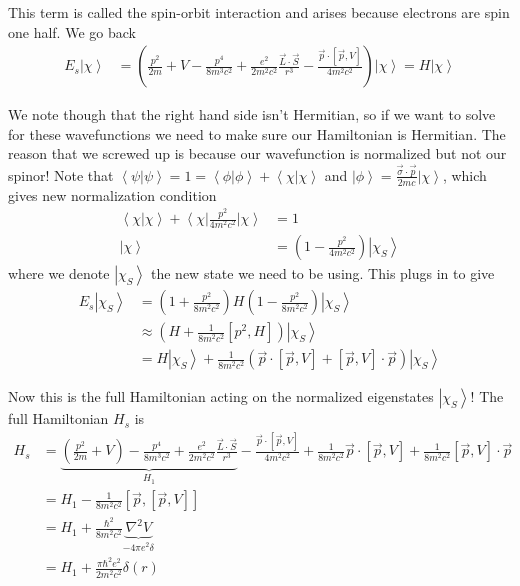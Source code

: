 \documentclass[10pt]{report}
\newcommand{\bra}[1]{\left<#1\right|}
\newcommand{\ket}[1]{\left|#1\right>}
\newcommand{\dotp}[2]{\left<#1\left.\right|#2\right>}
\begin{document}
This term is called the spin-orbit interaction and arises because electrons are spin one half. We go back
\begin{align}
    E_s\ket{\chi} &= \left( \frac{p^2}{2m} + V -\frac{p^4}{8m^3c^2} + \frac{e^2}{2m^2c^2}\frac{\vec{L}\cdot \vec{S}}{r^3} - \frac{\vec{p}\cdot\left[ \vec{p},V \right]}{4m^2c^2} \right)\ket{\chi} = H\ket{\chi}
\end{align}

We note though that the right hand side isn't Hermitian, so if we want to solve for these wavefunctions we need to make sure our Hamiltonian is Hermitian. The reason that we screwed up is because our wavefunction is normalized but not our spinor! Note that $\dotp{\psi}{\psi} = 1 = \dotp{\phi}{\phi} + \dotp{\chi}{\chi}$ and $\ket{\phi} = \frac{\vec{\sigma}\cdot \vec{p}}{2mc}\ket{\chi}$, which gives new normalization condition
\begin{align}
    \dotp{\chi}{\chi} + \bra{\chi}\frac{p^2}{4m^2c^2}\ket{\chi} &= 1\\
    \ket{\chi} &= \left( 1 - \frac{p^2}{4m^2c^2} \right)\ket{\chi_S}
\end{align}
where we denote $\ket{\chi_S}$ the new state we need to be using. This plugs in to give
\begin{align}
    E_s\ket{\chi_S} &= \left( 1 + \frac{p^2}{8m^2c^2} \right)H\left( 1 - \frac{p^2}{8m^2c^2} \right)\ket{\chi_S}\\
    &\approx \left( H + \frac{1}{8m^2c^2}\left[ p^2,H \right] \right)\ket{\chi_S}\\
    &= H\ket{\chi_S} + \frac{1}{8m^2c^2}\left( \vec{p}\cdot \left[ \vec{p},V \right] + \left[ \vec{p},V \right]\cdot \vec{p} \right)\ket{\chi_S}
\end{align}

Now this is the full Hamiltonian acting on the normalized eigenstates $\ket{\chi_S}$! The full Hamiltonian $H_s$ is
\begin{align}
    H_s &= \underbrace{\left( \frac{p^2}{2m} + V \right) - \frac{p^4}{8m^3c^2} + \frac{e^2}{2m^2c^2}\frac{\vec{L}\cdot \vec{S}}{r^3}}_{H_1} - \frac{\vec{p}\cdot \left[ \vec{p},V \right]}{4m^2c^2} + \frac{1}{8m^2c^2}\vec{p}\cdot \left[ \vec{p},V \right] + \frac{1}{8m^2c^2}\left[ \vec{p},V \right]\cdot \vec{p}\\
    &= H_1 - \frac{1}{8m^2c^2}\left[ \vec{p}, \left[ \vec{p},V \right] \right]\\
    &= H_1 + \frac{\hbar^2}{8m^2c^2}\underbrace{\nabla^2 V}_{-4\pi e^2\delta}\\
    &= H_1 + \frac{\pi \hbar^2e^2}{2m^2c^2}\delta(r)
\end{align}
\end{document}
